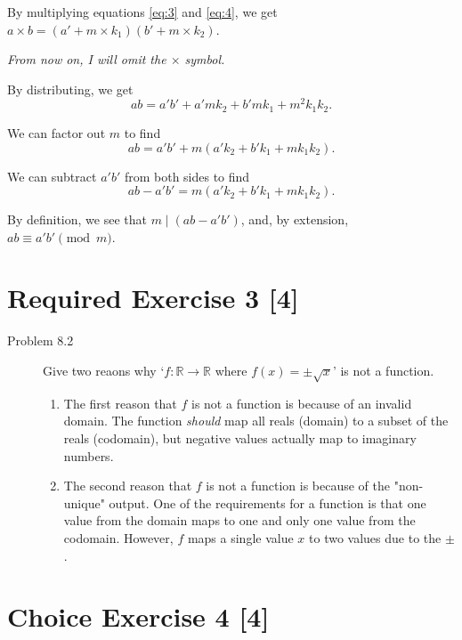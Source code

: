 \documentclass{article}
\begin{document}
\begin{enumerate}
{        By multiplying equations \ref{eq:3} and \ref{eq:4}, we get 
        \(a \times b = (a' + m\times k_1) (b' + m\times k_2)\).

        \textit{From now on, I will omit the \(\times\) symbol.}

        By distributing, we get 
        \[ab = a'b' + a'mk_2 + b'mk_1 + m^2k_1k_2.\]
        
        We can factor out \(m\) to find 
        \[ab = a'b' + m(a'k_2 + b'k_1 + mk_1k_2).\]

        We can subtract \(a'b'\) from both sides to find 
        \[ab - a'b' = m(a'k_2 + b'k_1 + mk_1k_2).\]

        By definition, we see that \(m \mid (ab - a'b')\), and, by extension, 
        \(ab \equiv a'b' \pmod{m}\).
    }
\end{enumerate}

\section*{Required Exercise 3 [4]}

\begin{description}
    \item[Problem 8.2] {
        Give two reaons why `\(f: \mathbb{R} \rightarrow \mathbb{R}\) where 
        \(f(x) = \pm \sqrt{x}\)' is not a function.

        \begin{enumerate}
            \item {
                The first reason that \(f\) is not a function is because of an invalid 
                domain. The function \textit{should} map all reals (domain) to a subset 
                of the reals (codomain), but negative values actually map to imaginary 
                numbers.
            }

            \item {
                The second reason that \(f\) is not a function is because of the 
                "non-unique" output. One of the requirements for a function is that 
                one value from the domain maps to one and only one value from the 
                codomain. However, \(f\) maps a single value \(x\) to two values due to 
                the \(\pm\). 
            }
        \end{enumerate}
    }
\end{description}

\section*{Choice Exercise 4 [4]}
\end{document}
